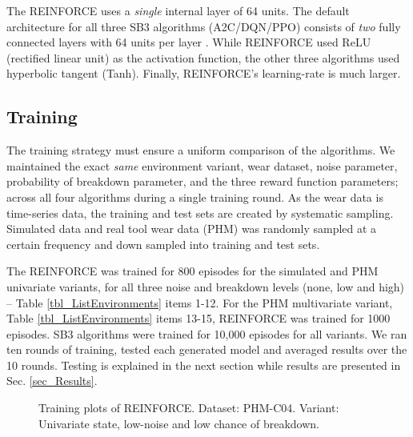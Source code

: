 \documentclass[referee, sn-mathphys-num]{sn-jnl}
\begin{document}
	The REINFORCE uses a \textit{single} internal layer of 64 units. The default architecture for all three SB3 algorithms (A2C/DQN/PPO) consists of \textit{two} fully connected layers with 64 units per layer \cite{SB3-DefaultNetwork}. While REINFORCE used ReLU (rectified linear unit) as the activation function, the other three algorithms used hyperbolic tangent (Tanh). Finally, REINFORCE's learning-rate is much larger.
	
	
	\subsection{Training}
	The training strategy must ensure a uniform comparison of the algorithms. We maintained the exact \textit{same} environment variant, wear dataset, noise parameter, probability of breakdown parameter, and the three reward function parameters; across all four algorithms during a single training round. %
	As the wear data is time-series data, the training and test sets are created by systematic sampling. Simulated data and real tool wear data (PHM) was randomly sampled at a certain frequency and down sampled into training and test sets.
	
	The REINFORCE was trained for 800 episodes for the simulated and PHM univariate variants, for all three noise and breakdown levels (none, low and high) -- Table \ref{tbl_ListEnvironments} items 1-12. For the PHM multivariate variant, Table \ref{tbl_ListEnvironments} items 13-15, REINFORCE was trained for 1000 episodes. SB3 algorithms were trained for 10,000 episodes for all variants. We ran ten rounds of training, tested each generated model and averaged results over the 10 rounds. Testing is explained in the next section while results are presented in Sec. \ref{sec_Results}.
	
	\begin{figure}
		\centering	
		\hfill
		\caption{Training plots of REINFORCE. Dataset: PHM-C04. Variant: Univariate state, low-noise and low chance of breakdown.}
		\label{fig_C04trplots}
	\end{figure}
	
\end{document}

